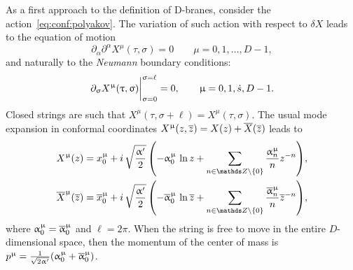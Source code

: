 As a first approach to the definition of D-branes, consider the action~\eqref{eq:conf:polyakov}.
The variation of such action with respect to $\delta X$ leads to the equation of motion
\begin{equation}
  \partial_{\alpha} \partial^{\alpha} X^{\mu}( \tau, \sigma ) = 0
  \qquad
  \mu = 0, 1, \dots, D - 1,
  \label{eq:tduality:eom}
\end{equation}
and naturally to the \emph{Neumann} boundary conditions:\footnotemark{}
\begin{equation}
  \eval{\ipd{\sigma} X^{\mu}( \tau, \sigma )}_{\sigma = 0}^{\sigma = \ell} = 0,
  \qquad
  \mu = 0, 1, \dots, D - 1.
  \label{eq:tduality:bc}
\end{equation}
Closed strings are such that $X^{\mu}( \tau, \sigma + \ell ) = X^{\mu}( \tau, \sigma )$.
The usual mode expansion in conformal coordinates $X^{\upmu}( z, \overline{z} ) = X( z ) + \overline{X}( \overline{z} )$ leads to
\begin{equation}
  \begin{split}
    X^{\mu}( z )
    & =
    x_0^{\mu}
    +
    i\, \sqrt{\frac{\ap}{2}}\,
    \qty(
      - \alpha_0^{\mu}\, \ln{z}
      + \sum\limits_{n \in \Z \setminus \{0\}} \frac{\alpha_n^{\mu}}{n} z^{-n}
    ),
    \\
    \barX^{\mu}( \barz )
    & =
    \barx_0^{\mu}
    +
    i\, \sqrt{\frac{\ap}{2}}\,
    \qty(
      - \balpha_0^{\mu}\, \ln{\barz}
      + \sum\limits_{n \in \Z \setminus \{0\}} \frac{\balpha_n^{\mu}}{n} \barz^{-n}
    ),
  \end{split}
  \label{eq:tduality:modes}
\end{equation}
where $\upalpha_0^{\upmu} = \overline{\upalpha}_0^{\upmu}$ and $\ell = 2 \pi$.
When the string is free to move in the entire $D$-dimensional space, then the momentum of the center of mass is $p^{\upmu} = \frac{1}{\sqrt{2 \upalpha'}} ( \upalpha_0^{\upmu} + \overline{\upalpha}_0^{\upmu} )$.


